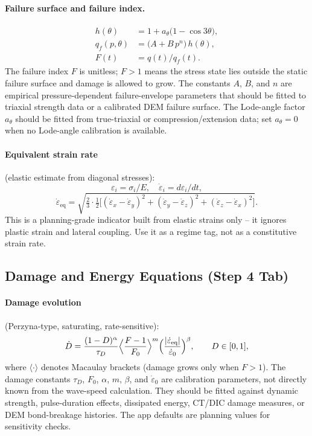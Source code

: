 \documentclass[11pt,a4paper]{article}
\newcommand{\sig}{\sigma}
\newcommand{\eps}{\varepsilon}
\newcommand{\epsdot}{\dot\eps}
\begin{document}
\paragraph{Failure surface and failure index.}
\begin{align}
  h(\theta) &= 1 + a_\theta\bigl(1 - \cos 3\theta\bigr), \\
  q_f(p,\theta) &= \bigl(A + B\,p^{n}\bigr)\,h(\theta), \\
  F(t) &= q(t) / q_f(t).
\end{align}
The failure index $F$ is unitless; $F > 1$ means the stress state lies outside
the static failure surface and damage is allowed to grow.
The constants $A$, $B$, and $n$ are empirical pressure-dependent failure-envelope
parameters that should be fitted to triaxial strength data or a calibrated DEM
failure surface. The Lode-angle factor $a_\theta$ should be fitted from
true-triaxial or compression/extension data; set $a_\theta=0$ when no
Lode-angle calibration is available.

\paragraph{Equivalent strain rate} (elastic estimate from diagonal stresses):
\begin{equation}
  \eps_i = \sig_i / E, \quad \epsdot_i = d\eps_i / dt,
\end{equation}
\begin{equation}
  \epsdot_{\text{eq}} = \sqrt{\tfrac{2}{3} \cdot \tfrac{1}{2}\bigl[(\epsdot_x - \epsdot_y)^2 + (\epsdot_y - \epsdot_z)^2 + (\epsdot_z - \epsdot_x)^2\bigr]}.
\end{equation}
This is a planning-grade indicator built from elastic strains only -- it
ignores plastic strain and lateral coupling. Use it as a regime tag, not as a
constitutive strain rate.

\subsection{Damage and Energy Equations (Step 4 Tab)}

\paragraph{Damage evolution} (Perzyna-type, saturating, rate-sensitive):
\begin{equation}
  \dot D = \frac{(1-D)^{\alpha}}{\tau_D}
           \Bigl\langle \frac{F-1}{F_0} \Bigr\rangle^{m}
           \Bigl(\frac{|\epsdot_{\text{eq}}|}{\epsdot_0}\Bigr)^{\beta},
  \qquad D \in [0,1],
\end{equation}
where $\langle\cdot\rangle$ denotes Macaulay brackets (damage grows only when
$F > 1$).
The damage constants $\tau_D$, $F_0$, $\alpha$, $m$, $\beta$, and
$\epsdot_0$ are calibration parameters, not directly known from the wave-speed
calculation. They should be fitted against dynamic strength, pulse-duration
effects, dissipated energy, CT/DIC damage measures, or DEM bond-breakage
histories. The app defaults are planning values for sensitivity checks.
\end{document}
